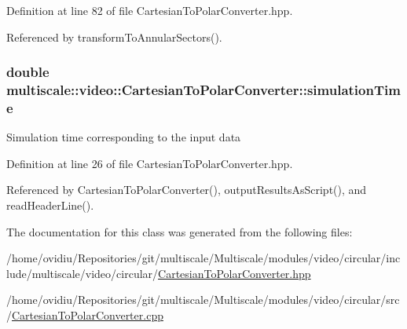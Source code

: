 \-Definition at line 82 of file \-Cartesian\-To\-Polar\-Converter.\-hpp.



\-Referenced by transform\-To\-Annular\-Sectors().

\hypertarget{classmultiscale_1_1video_1_1CartesianToPolarConverter_a78003dc9053d89f56c03408f7f8fedda}{
\subsubsection[{simulation\-Time}]{\setlength{\rightskip}{0pt plus 5cm}double {\bf multiscale\-::video\-::\-Cartesian\-To\-Polar\-Converter\-::simulation\-Time}}}\label{classmultiscale_1_1video_1_1CartesianToPolarConverter_a78003dc9053d89f56c03408f7f8fedda}
\-Simulation time corresponding to the input data 

\-Definition at line 26 of file \-Cartesian\-To\-Polar\-Converter.\-hpp.



\-Referenced by \-Cartesian\-To\-Polar\-Converter(), output\-Results\-As\-Script(), and read\-Header\-Line().



\-The documentation for this class was generated from the following files\-:\begin{DoxyCompactItemize}
\item 
/home/ovidiu/\-Repositories/git/multiscale/\-Multiscale/modules/video/circular/include/multiscale/video/circular/\hyperlink{CartesianToPolarConverter_8hpp}{\-Cartesian\-To\-Polar\-Converter.\-hpp}\item 
/home/ovidiu/\-Repositories/git/multiscale/\-Multiscale/modules/video/circular/src/\hyperlink{CartesianToPolarConverter_8cpp}{\-Cartesian\-To\-Polar\-Converter.\-cpp}\end{DoxyCompactItemize}
